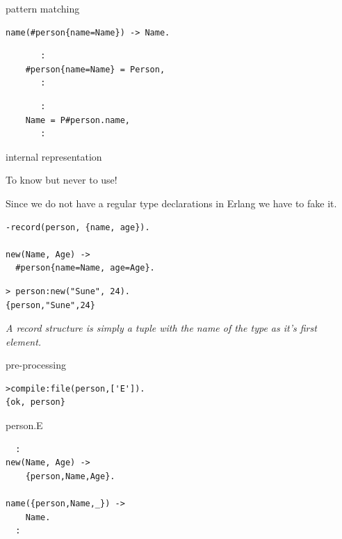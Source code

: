 \begin{frame}[fragile]{pattern matching}

\begin{verbatim}
name(#person{name=Name}) -> Name.
\end{verbatim}

\pause\vspace{10pt}

\begin{verbatim}
       :
    #person{name=Name} = Person,
       :
\end{verbatim}

\pause\vspace{10pt}

\begin{verbatim}
       :
    Name = P#person.name,
       :
\end{verbatim}

\end{frame}

\begin{frame}[fragile]{internal representation}

To know but never to use!
\pause\vspace{20pt}

Since we do not have a regular type declarations in Erlang we have to
fake it. 

\begin{verbatim}
-record(person, {name, age}).

new(Name, Age) ->
  #person{name=Name, age=Age}.
\end{verbatim}

\pause\vspace{20pt}

\begin{verbatim}
> person:new("Sune", 24).
{person,"Sune",24}
\end{verbatim}

\pause\vspace{20pt}
{\em A record structure is simply a tuple with the name of the type as it's first element.}

\end{frame}

\begin{frame}[fragile]{pre-processing}

\begin{verbatim}
>compile:file(person,['E']).
{ok, person}
\end{verbatim}

\pause\vspace{20pt}
\begin{block}{person.E}
\begin{verbatim}
  :
new(Name, Age) ->
    {person,Name,Age}.

name({person,Name,_}) ->
    Name.
  :
\end{verbatim}
\end{block}

\end{frame}

